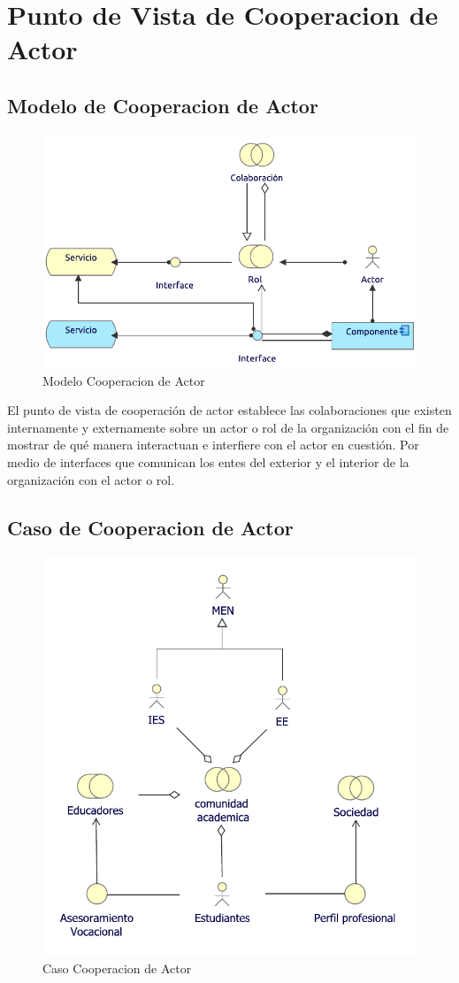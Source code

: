 \section{Punto de Vista de Cooperacion de Actor}


\subsection{Modelo de Cooperacion de Actor}
\begin{figure}[h!]
	\centering
	\includegraphics[width=.6\linewidth]{imgs/modelo/CoopActor.pdf}
	\caption{Modelo Cooperacion de Actor}
\end{figure}

El punto de vista de cooperación de actor establece las colaboraciones que existen internamente y externamente sobre un actor o rol de la organización con el fin de mostrar de qué manera interactuan e interfiere con el actor en cuestión. Por medio de interfaces  que comunican los entes del exterior y el interior de la organización con el actor o rol.

\newpage
\subsection{Caso  de Cooperacion de Actor}
\begin{figure}[h!]
	\centering
	\includegraphics[width=.9\linewidth]{imgs/caso/negocio/coperacion_actor.pdf}
	\caption{Caso Cooperacion de Actor}
\end{figure}

